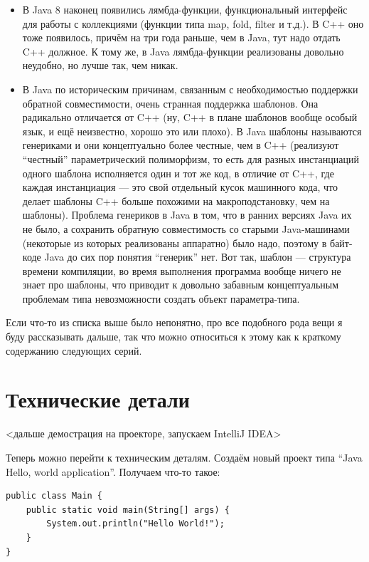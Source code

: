\documentclass[a5paper]{article}
\begin{document}
\begin{itemize}
	\item В Java 8 наконец появились лямбда-функции, функциональный интерфейс для работы с коллекциями (функции типа map, fold, filter и т.д.). В C++ оно тоже появилось, причём на три года раньше, чем в Java, тут надо отдать C++ должное. К тому же, в Java лямбда-функции реализованы довольно неудобно, но лучше так, чем никак.
	\item В Java по историческим причинам, связанным с необходимостью поддержки обратной совместимости, очень странная поддержка шаблонов. Она радикально отличается от C++ (ну, C++ в плане шаблонов вообще особый язык, и ещё неизвестно, хорошо это или плохо). В Java шаблоны называются генериками и они концептуально более честные, чем в C++ (реализуют ``честный'' параметрический полиморфизм, то есть для разных инстанциаций одного шаблона исполняется один и тот же код, в отличие от C++, где каждая инстанциация --- это свой отдельный кусок машинного кода, что делает шаблоны C++ больше похожими на макроподстановку, чем на шаблоны). Проблема генериков в Java в том, что в ранних версиях Java их не было, а сохранить обратную совместимость со старыми Java-машинами (некоторые из которых реализованы аппаратно) было надо, поэтому в байт-коде Java до сих пор понятия ``генерик'' нет. Вот так, шаблон --- структура времени компиляции, во время выполнения программа вообще ничего не знает про шаблоны, что приводит к довольно забавным концептуальным проблемам типа невозможности создать объект параметра-типа.
\end{itemize}

Если что-то из списка выше было непонятно, про все подобного рода вещи я буду рассказывать дальше, так что можно относиться к этому как к краткому содержанию следующих серий.

\section{Технические детали}

<дальше демострация на проекторе, запускаем IntelliJ IDEA>

Теперь можно перейти к техническим деталям. Создаём новый проект типа ``Java Hello, world application''. Получаем что-то такое:

\begin{verbatim}
public class Main {
    public static void main(String[] args) {
        System.out.println("Hello World!");
    }
}
\end{verbatim}
\end{document}
